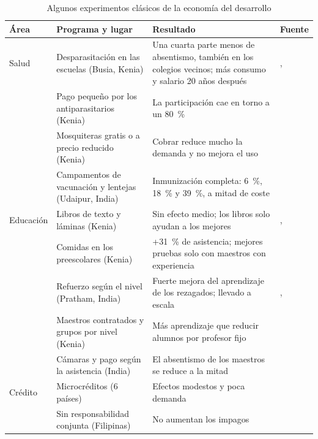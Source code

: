 \documentclass[11pt]{article}
\begin{document}
\begin{table}[H]
\centering
\caption{Algunos experimentos clásicos de la economía del desarrollo}\label{tab:experimentos}
\footnotesize
\renewcommand{\arraystretch}{1.3}
\begin{tabular}{>{\raggedright\arraybackslash}m{1.9cm}>{\raggedright\arraybackslash}m{4.3cm}>{\raggedright\arraybackslash}m{5.4cm}>{\raggedright\arraybackslash}m{2.9cm}}
\toprule
\rowcolor{tceeazulpalido}\textbf{Área} & \textbf{Programa y lugar} & \textbf{Resultado} & \textbf{Fuente}\\
\midrule
Salud & Desparasitación en las escuelas (Busia, Kenia) & Una cuarta parte menos de absentismo, también en los colegios vecinos; más consumo y salario 20 años después & \textcite{MiguelKremer2004}, \textcite{HamoryEtAl2021}\\
 & Pago pequeño por los antiparasitarios (Kenia) & La participación cae en torno a un 80~\% & \textcite{KremerMiguel2007}\\
 & Mosquiteras gratis o a precio reducido (Kenia) & Cobrar reduce mucho la demanda y no mejora el uso & \textcite{CohenDupas2010}\\
 & Campamentos de vacunación y lentejas (Udaipur, India) & Inmunización completa: 6~\%, 18~\% y 39~\%, a mitad de coste & \textcite{BanerjeeDufloGlennersterKothari2010}\\
\midrule
Educación & Libros de texto y láminas (Kenia) & Sin efecto medio; los libros solo ayudan a los mejores & \textcite{GlewweKremerMoulin2009}, \textcite{GlewweKremerMoulinZitzewitz2004}\\
 & Comidas en los preescolares (Kenia) & +31~\% de asistencia; mejores pruebas solo con maestros con experiencia & \textcite{VermeerschKremer2005}\\
 & Refuerzo según el nivel (Pratham, India) & Fuerte mejora del aprendizaje de los rezagados; llevado a escala & \textcite{BanerjeeColeDufloLinden2007}, \textcite{BanerjeeEtAl2017}\\
 & Maestros contratados y grupos por nivel (Kenia) & Más aprendizaje que reducir alumnos por profesor fijo & \textcite{DufloDupasKremer2011,DufloDupasKremer2015}\\
 & Cámaras y pago según la asistencia (India) & El absentismo de los maestros se reduce a la mitad & \textcite{DufloHannaRyan2012}\\
\midrule
Crédito & Microcréditos (6 países) & Efectos modestos y poca demanda & \textcite{BanerjeeKarlanZinman2015}\\
 & Sin responsabilidad conjunta (Filipinas) & No aumentan los impagos & \textcite{GineKarlan2014}\\

\end{tabular}
\end{table}
\end{document}
